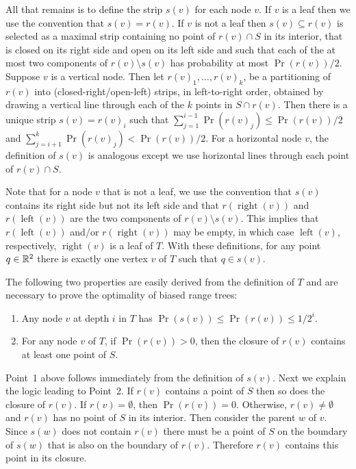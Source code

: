 \documentclass{patmorin}
\DeclareMathOperator{\lft}{left}
\DeclareMathOperator{\rght}{right}
\begin{document}
All that remains is to define the strip $s(v)$ for each node $v$. If $v$
is a leaf then we use the convention that $s(v)=r(v)$.  If $v$ is not a
leaf then $s(v)\subseteq r(v)$ is selected as a maximal strip containing
no point of $r(v)\cap S$ in its interior, that is closed on its right
side and open on its left side and such that each of the at most two
components of $r(v)\setminus s(v)$ has probability at most $\Pr(r(v))/2$.
Suppose $v$ is a vertical node.  Then let $r(v)_1,\ldots,r(v)_k$,
be a partitioning of $r(v)$ into (closed-right/open-left) strips,
in left-to-right order, obtained by drawing a vertical line through
each of the $k$ points in $S\cap r(v)$.  Then there is a unique strip
$s(v)=r(v)_i$ such that $\sum_{j=1}^{i-1} \Pr(r(v)_j) \le \Pr(r(v))/2$
and $\sum_{j=i+1}^{k} \Pr(r(v)_j) < \Pr(r(v))/2$.  For a horizontal
node $v$, the definition of $s(v)$ is analogous except we use horizontal
lines through each point of $r(v)\cap S$.

Note that for a node $v$ that is not a leaf, we use the convention
that $s(v)$ contains its right side but not its left side and that
$r(\rght(v))$ and $r(\lft(v))$ are the two components of $r(v)\setminus
s(v)$.  This implies that $r(\lft(v))$ and/or $r(\rght(v))$ may be
empty, in which case $\lft(v)$, respectively, $\rght(v)$ is a leaf of
$T$.  With these definitions, for any point $q\in \mathbb{R}^2$ there is
exactly one vertex $v$ of $T$ such that $q\in s(v)$.

The following two properties are easily derived from the definition of
$T$ and are necessary to prove the optimality of biased range trees:
\begin{enumerate}

\item Any node $v$ at depth $i$ in $T$ has $\Pr(s(v))\le \Pr(r(v))\le 1/2^i$.

\item For any node $v$ of $T$, if $\Pr(r(v)) > 0$, then the closure of
$r(v)$ contains at least one point of $S$.
\end{enumerate}

Point~1 above follows immediately from the definition of $s(v)$. Next we
explain the logic leading to Point~2.  If $r(v)$ contains a point of $S$
then so does the closure of $r(v)$.   If $r(v)=\emptyset$, then $\Pr(r(v))
= 0$.  Otherwise, $r(v) \neq \emptyset$ and $r(v)$ has no point of $S$ in
its interior.  Then consider the parent $w$ of $v$.  Since $s(w)$ does not
contain $r(v)$ there must be a point of $S$ on the boundary of $s(w)$ that
is also on the boundary of $r(v)$.  Therefore $r(v)$ contains this point in
its closure.
\end{document}
